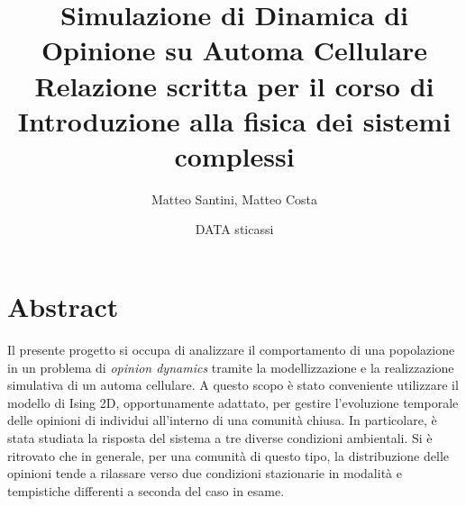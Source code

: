 \documentclass[letterpaper,10pt]{article}
\begin{document}
\title{\Huge Simulazione di Dinamica di Opinione su Automa Cellulare 
		\[\]\Large Relazione scritta per il corso di \\ Introduzione alla fisica dei sistemi complessi \medskip
		}
\author{Matteo Santini, Matteo Costa}
\date{DATA sticassi}

\maketitle
\tableofcontents
\bigskip

 \section{Abstract}
Il presente progetto si occupa di analizzare il comportamento di una popolazione in un problema di \textit{opinion dynamics} tramite la modellizzazione e la realizzazione simulativa di un automa cellulare. A questo scopo è stato conveniente utilizzare il modello di Ising 2D, opportunamente adattato, per gestire l'evoluzione temporale delle opinioni di individui all'interno di una comunità chiusa. In particolare, è stata studiata la risposta del sistema a tre diverse condizioni ambientali. Si è ritrovato che in generale, per una comunità di questo tipo, la distribuzione delle opinioni tende a rilassare verso due condizioni stazionarie in modalità e tempistiche differenti a seconda del caso in esame.
\end{document}
